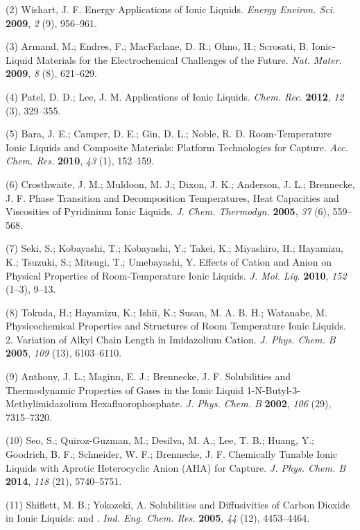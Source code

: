 (2) Wishart, J. F. Energy Applications of Ionic Liquids. \emph{Energy Environ. Sci.} \textbf{2009}, \emph{2} (9), 956--961.

(3) Armand, M.; Endres, F.; MacFarlane, D. R.; Ohno, H.; Scrosati, B.  Ionic-Liquid Materials for the Electrochemical Challenges of the Future.  \emph{Nat. Mater.} \textbf{2009}, \emph{8} (8), 621--629.

(4) Patel, D. D.; Lee, J. M. Applications of Ionic Liquids. \emph{Chem.  Rec.} \textbf{2012}, \emph{12} (3), 329--355.

(5) Bara, J. E.; Camper, D. E.; Gin, D. L.; Noble, R. D.  Room-Temperature Ionic Liquids and Composite Materials: Platform Technologies for  Capture. \emph{Acc. Chem. Res.}  \textbf{2010}, \emph{43} (1), 152--159.

(6) Crosthwaite, J. M.; Muldoon, M. J.; Dixon, J. K.; Anderson, J. L.; Brennecke, J. F. Phase Transition and Decomposition Temperatures, Heat Capacities and Viscosities of Pyridinium Ionic Liquids. \emph{J. Chem.  Thermodyn.} \textbf{2005}, \emph{37} (6), 559--568.

(7) Seki, S.; Kobayashi, T.; Kobayashi, Y.; Takei, K.; Miyashiro, H.; Hayamizu, K.; Tsuzuki, S.; Mitsugi, T.; Umebayashi, Y. Effects of Cation and Anion on Physical Properties of Room-Temperature Ionic Liquids.  \emph{J. Mol. Liq.} \textbf{2010}, \emph{152} (1--3), 9--13.

(8) Tokuda, H.; Hayamizu, K.; Ishii, K.; Susan, M. A. B. H.; Watanabe, M. Physicochemical Properties and Structures of Room Temperature Ionic Liquids. 2. Variation of Alkyl Chain Length in Imidazolium Cation.  \emph{J. Phys. Chem. B} \textbf{2005}, \emph{109} (13), 6103--6110.

(9) Anthony, J. L.; Maginn, E. J.; Brennecke, J. F. Solubilities and Thermodynamic Properties of Gases in the Ionic Liquid 1-N-Butyl-3-Methylimidazolium Hexafluorophosphate. \emph{J. Phys. Chem.  B} \textbf{2002}, \emph{106} (29), 7315--7320.

(10) Seo, S.; Quiroz-Guzman, M.; Desilva, M. A.; Lee, T. B.; Huang, Y.; Goodrich, B. F.; Schneider, W. F.; Brennecke, J. F. Chemically Tunable Ionic Liquids with Aprotic Heterocyclic Anion (AHA) for  Capture. \emph{J. Phys. Chem. B} \textbf{2014}, \emph{118} (21), 5740--5751.

(11) Shiflett, M. B.; Yokozeki, A. Solubilities and Diffusivities of Carbon Dioxide in Ionic Liquids: \ce{[bmim][PF6]} and \ce{[bmim][BF4]}. \emph{Ind. Eng. Chem. Res.}  \textbf{2005}, \emph{44} (12), 4453--4464.


